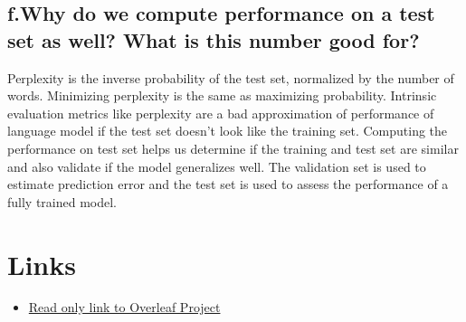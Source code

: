 \documentclass{article}
\begin{document}
\subsection*{f.Why do we compute performance on a test set as well? What is this number good for?}

Perplexity is the inverse probability of the test set, normalized by the number of words. Minimizing perplexity is the same as maximizing probability. Intrinsic evaluation metrics like perplexity are a bad approximation of performance of language model if the test set doesn't look like the training set. Computing the performance on test set helps us determine if the training and test set are similar and also validate if the model generalizes well.
The validation set is used to estimate prediction error and the test set is used to assess the performance of a fully trained model.
\section*{Links}
\begin{itemize}
    \item \href{https://www.overleaf.com/read/rpbsgtxdycmx}{Read only link to Overleaf Project}
\end{itemize}



\end{document}

